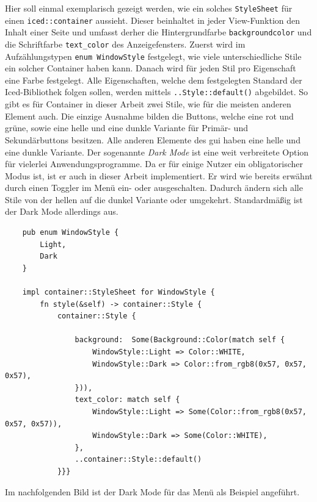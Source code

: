 Hier soll einmal exemplarisch gezeigt werden, wie ein solches \lstinline{StyleSheet} für einen \lstinline{iced::container} aussieht. Dieser beinhaltet in jeder View-Funktion den Inhalt einer Seite 
und umfasst derher die Hintergrundfarbe \lstinline{backgroundcolor} und die Schriftfarbe \lstinline{text_color} des Anzeigefensters. 
Zuerst wird im Aufzählungstypen \lstinline{enum WindowStyle} festgelegt, wie viele unterschiedliche Stile ein solcher Container haben kann. 
Danach wird für jeden Stil pro Eigenschaft eine Farbe festgelegt. Alle Eigenschaften, welche dem festgelegten Standard der Iced-Bibliothek folgen sollen, werden mittels 
\lstinline{..Style::default()} abgebildet. So gibt es für Container in dieser Arbeit zwei Stile, wie für die meisten anderen Element auch. Die einzige Ausnahme bilden die Buttons, welche eine rot und grüne, 
sowie eine helle und eine dunkle Variante für Primär- und Sekundärbuttons besitzen. 
Alle anderen Elemente des \ac{gui} haben eine helle und eine dunkle Variante. Der sogenannte \emph{Dark Mode} ist eine weit verbreitete Option für vielerlei Anwendungsprogramme. Da er für einige Nutzer ein obligatorischer Modus ist,
ist er auch in dieser Arbeit implementiert. Er wird wie bereits erwähnt durch einen Toggler im Menü ein- oder ausgeschalten. Dadurch ändern sich alle Stile von der hellen auf die dunkel Variante oder umgekehrt. 
Standardmäßig ist der Dark Mode allerdings aus.

\begin{lstlisting}
    pub enum WindowStyle {
        Light,
        Dark
    }

    impl container::StyleSheet for WindowStyle {
        fn style(&self) -> container::Style {
            container::Style { 
                
                background:  Some(Background::Color(match self {
                    WindowStyle::Light => Color::WHITE,
                    WindowStyle::Dark => Color::from_rgb8(0x57, 0x57, 0x57),
                })),
                text_color: match self {
                    WindowStyle::Light => Some(Color::from_rgb8(0x57, 0x57, 0x57)),
                    WindowStyle::Dark => Some(Color::WHITE),
                },
                ..container::Style::default()
            }}}

\end{lstlisting}

Im nachfolgenden Bild ist der Dark Mode für das Menü als Beispiel angeführt.

